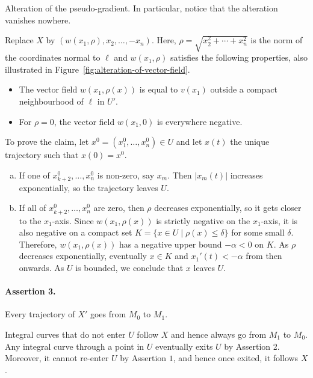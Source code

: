 \begin{myproof}
\begin{myproof}
    \begin{marginfigure}
        \centering
        \caption{Alteration of the pseudo-gradient. In particular, notice that the alteration vanishes nowhere.}
        \label{fig:alteration-of-vector-field}
    \end{marginfigure}
    Replace $X$ by  $(w(x_1, \rho), x_2, \ldots, -x_n)$.
    Here, $\rho = \sqrt{x_2^2 + \cdots + x_n^2}$ is the norm of the coordinates normal to $\ell$ and $w(x_1, \rho)$ satisfies the following properties, also illustrated in Figure~\ref{fig:alteration-of-vector-field}.
    \begin{itemize}
        \item The vector field $w(x_1, \rho(x))$ is equal to $v(x_1)$ outside a compact neighbourhood of  $ \ell$ in $U'$.
        \item For $\rho = 0$, the vector field $w(x_1, 0)$ is everywhere negative.
    \end{itemize}
    To prove the claim, let $x^0 = (x_1^{0}, \ldots, x_n^{0}) \in U$ and let $x(t)$ the unique trajectory such that  $x(0) = x^{0}$.
    \begin{enumerate}[(a)]
        \item If one of $x_{k+2}^{0}, \ldots, x_n^{0}$ is non-zero, say $x_m$. Then $|x_m(t)|$ increases exponentially, so the trajectory leaves $U$.
        \item If all of $x_{k+2}^{0}, \ldots, x_n^{0}$ are zero, then $\rho$ decreases exponentially, so it gets closer to the $x_1$-axis.
            Since $w(x_1, \rho(x))$ is strictly negative on the $ x_1$-axis, it is also negative on a compact set $K = \{ x \in U  \mid  \rho(x) \le  \delta\} $ for some small $\delta$.
            Therefore, $ w(x_1, \rho(x))$ has a negative upper bound $-\alpha < 0$ on $K$.
            As $\rho$ decreases exponentially, eventually  $x \in K$ and $x_1'(t) < -\alpha$ from then onwards.
            As $U$ is bounded, we conclude that $x$ leaves $U$. \qedhere
    \end{enumerate}
\end{myproof}
\paragraph{Assertion 3.}
Every trajectory of $X'$ goes from $M_0$ to $M_1$.
\begin{myproof}
    Integral curves that do not enter $U$ follow $X$ and hence always go from  $M_1$ to $M_0$.
    Any integral curve through a point in $U$ eventually exits $U$ by Assertion 2. Moreover, it cannot re-enter $U$ by Assertion $1$, and hence once exited, it follows $X$.
\end{myproof}


\end{myproof}
